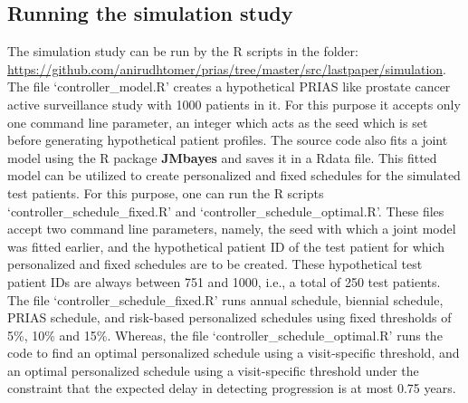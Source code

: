 \subsection{Running the simulation study}
The simulation study can be run by the R scripts in the folder: \url{https://github.com/anirudhtomer/prias/tree/master/src/lastpaper/simulation}. The file `controller\_model.R' creates a hypothetical PRIAS like prostate cancer active surveillance study with 1000 patients in it. For this purpose it accepts only one command line parameter, an integer which acts as the seed which is set before generating hypothetical patient profiles. The source code also fits a joint model using the R package \textbf{JMbayes} and saves it in a Rdata file. This fitted model can be utilized to create personalized and fixed schedules for the simulated test patients. For this purpose, one can run the R scripts `controller\_schedule\_fixed.R' and `controller\_schedule\_optimal.R'. These files accept two command line parameters, namely, the seed with which a joint model was fitted earlier, and the hypothetical patient ID of the test patient for which personalized and fixed schedules are to be created. These hypothetical test patient IDs are always between 751 and 1000, i.e., a total of 250 test patients. The file `controller\_schedule\_fixed.R' runs annual schedule, biennial schedule, PRIAS schedule, and risk-based personalized schedules using fixed thresholds of 5\%, 10\% and 15\%. Whereas, the file `controller\_schedule\_optimal.R' runs the code to find an optimal personalized schedule using a visit-specific threshold, and an optimal personalized schedule using a visit-specific threshold under the constraint that the expected delay in detecting progression is at most 0.75 years.